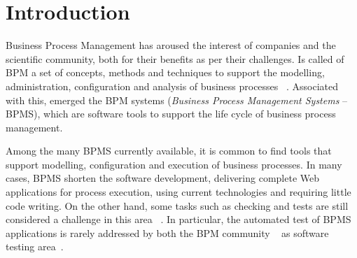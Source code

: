 \documentclass[runningheads,a4paper]{llncs}
\begin{document}
\section{Introduction}


Business Process Management has aroused the interest of companies and the scientific community, both for their benefits as per their challenges. Is called of BPM a set of concepts, methods and techniques to support the modelling, administration, configuration and analysis of business processes  ~\cite{weske}. Associated with this, emerged the BPM systems (\emph{Business Process Management Systems} -- BPMS), which are software tools to support the life cycle of business process management.


Among the many BPMS currently available, it is common to find tools that support modelling, configuration and execution of business processes. In many cases, BPMS shorten the software development, delivering complete Web applications for process execution, using current technologies and requiring little code writing. On the other hand, some tasks such as checking and tests are still considered a challenge in this area ~\cite{aalst2013survey}. In particular, the automated test of BPMS applications is rarely addressed by both the BPM community ~\cite{weske} as software testing area~\cite{graham2012experiences}.
 
\end{document}
